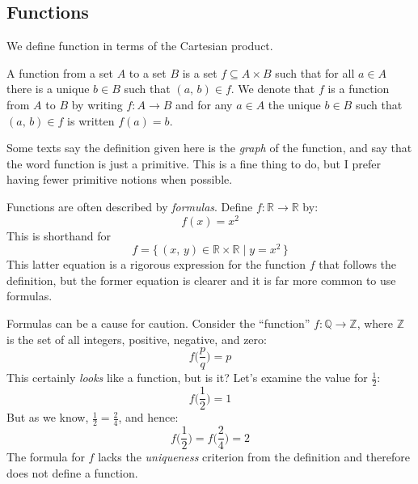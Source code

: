         \subsection{Functions}
            We define function in terms of the Cartesian product.
            \begin{definition}
                A function from a set $A$ to a set $B$ is a set
                $f\subseteq{A}\times{B}$ such that for all $a\in{A}$ there is
                a unique $b\in{B}$ such that $(a,\,b)\in{f}$. We denote that
                $f$ is a function from $A$ to $B$ by writing
                $f:A\rightarrow{B}$ and for any $a\in{A}$ the unique $b\in{B}$
                such that $(a,\,b)\in{f}$ is written
                $f(a)=b$.
            \end{definition}
            Some texts say the definition given here is the
            \textit{graph} of the function, and say that the word function is
            just a primitive. This is a fine thing to do, but I prefer having
            fewer primitive notions when possible.
            \begin{example}
                Functions are often described by \textit{formulas}. Define
                $f:\mathbb{R}\rightarrow\mathbb{R}$ by:
                \begin{equation}
                    f(x)=x^{2}
                \end{equation}
                This is shorthand for
                \begin{equation}
                    f=\{\,(x,\,y)\in\mathbb{R}\times\mathbb{R}\;|\;
                        y=x^{2}\,\}
                \end{equation}
                This latter equation is a rigorous expression for the function
                $f$ that follows the definition, but the former equation is
                clearer and it is far more common to use formulas.
            \end{example}
            \begin{example}
                Formulas can be a cause for caution. Consider the
                ``function'' $f:\mathbb{Q}\rightarrow\mathbb{Z}$, where
                $\mathbb{Z}$ is the set of all integers, positive, negative,
                and zero:
                \begin{equation}
                    f\big(\frac{p}{q}\big)=p
                \end{equation}
                This certainly \textit{looks} like a function, but is it?
                Let's examine the value for $\frac{1}{2}$:
                \begin{equation}
                    f\big(\frac{1}{2}\big)=1
                \end{equation}
                But as we know, $\frac{1}{2}=\frac{2}{4}$, and hence:
                \begin{equation}
                    f\big(\frac{1}{2}\big)=f\big(\frac{2}{4}\big)=2
                \end{equation}
                The formula for $f$ lacks the \textit{uniqueness} criterion from
                the definition and therefore does not define a function.
            \end{example}
